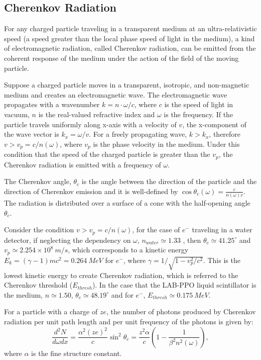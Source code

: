 \subsection{Cherenkov Radiation}
For any charged particle traveling in a transparent medium at an ultra-relativistic speed (a speed greater than the local phase speed of light in the medium),  a kind of electromagnetic radiation, called Cherenkov radiation, can be emitted from the coherent response of the medium under the action of the field of the moving particle\cite{jackson2007classical,landau2013electrodynamics}.

Suppose a charged particle moves in a transparent, isotropic, and non-magnetic medium and creates an electromagnetic wave. The electromagnetic wave propagates with a wavenumber $k=n\cdot\omega/c$, where $c$ is the speed of light in vacuum, $n$ is the real-valued refractive index and $\omega$ is the frequency. If the particle travels uniformly along x-axis with a velocity of $v$, the x-component of the wave vector is $k_x=\omega/v$. For a freely propagating wave, $k>k_x$, therefore $v>v_p=c/n(\omega)$, where $v_p$ is the phase velocity in the medium. Under this condition that the speed of the charged particle is greater than the $v_p$, the Cherenkov radiation is emitted with a frequency of $\omega$\cite{landau2013electrodynamics}.   

The Cherenkov angle, $\theta_c$ is the angle between the direction of the particle and the direction of Cherenkov emission and it is well-defined by $\cos\theta_c(\omega) = \frac{c}{n(\omega)v}$. The radiation is distributed over a surface of a cone with the half-opening angle $\theta_c$. 

Consider the condition $v>v_p=c/n(\omega)$, for the case of $e^-$ traveling in a water detector, if neglecting the dependency on $\omega$, $n_{water}\simeq 1.33$ \cite{pdg2020}, then $\theta_c\simeq 41.25^\circ$ and $v_p\simeq 2.254\times10^8~m/s$, which corresponds to a kinetic energy $E_k=(\gamma-1)mc^2=0.264~MeV$ for $e^-$, where $\gamma=1/\sqrt{1-v_p^2/c^2}$. This is the lowest kinetic energy to create Cherenkov radiation, which is referred to the Cherenkov threshold ($E_{thresh}$). In the case that the LAB-PPO liquid scintillator is the medium, $n\simeq 1.50$\cite{tseung2011ellipsometric}, $\theta_c\simeq 48.19^\circ$ and for $e^-$, $E_{thresh}\simeq 0.175~MeV$.   

For a particle with a charge of $ze$, the number of photons produced by Cherenkov radiation per unit path length and per unit frequency of the photons is given by\cite{leo2012techniques}:
\[
\frac{d^2N}{d\omega dx}=\frac{\alpha^2 (ze)^2}{c}\sin^2\theta_c=\frac{z^2\alpha}{c}(1-\frac{1}{\beta^2 n^2(\omega)}),
\]
where $\alpha$ is the fine structure constant.

